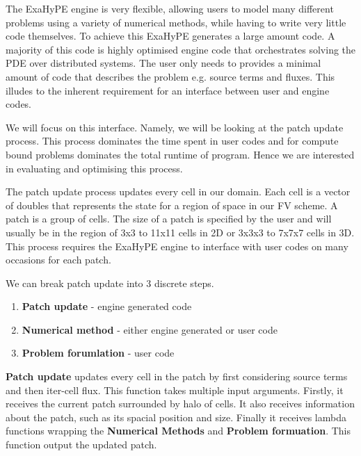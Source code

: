 


The ExaHyPE engine is very flexible, allowing users to model many different problems using a variety of numerical methods, while having to write very little code themselves.
To achieve this ExaHyPE generates a large amount code.
A majority of this code is highly optimised engine code that orchestrates solving the PDE over distributed systems.
The user only needs to provides a minimal amount of code that describes the problem e.g. source terms and fluxes.
This illudes to the inherent requirement for an interface between user and engine codes.

We will focus on this interface.
Namely, we will be looking at the patch update process.
This process dominates the time spent in user codes and for compute bound problems dominates the total runtime of program.
Hence we are interested in evaluating and optimising this process.

The patch update process updates every cell in our domain.
Each cell is a vector of doubles that represents the state for a region of space in our FV scheme. 
A patch is a group of cells.
The size of a patch is specified by the user and will usually be in the region of 3x3 to 11x11 cells in 2D or 3x3x3 to 7x7x7 cells in 3D. %
This process requires the ExaHyPE engine to interface with user codes on many occasions for each patch.
 
\newcommand{\func}[1]{\textbf{#1}}
\newcommand{\var}[1]{\textbf{#1}}

We can break patch update into 3 discrete steps.
\begin{enumerate}
    \item \func{Patch update} - engine generated code
    \item  \func{Numerical method} - either engine generated or user code
    \item \func{Problem forumlation} - user code
\end{enumerate}

\func{Patch update} updates every cell in the patch by first considering source terms and then iter-cell flux.
This function takes multiple input arguments.
Firstly, it receives the current patch surrounded by halo of cells.
It also receives information about the patch, such as its spacial position and size.
Finally it receives lambda functions wrapping the \func{Numerical Methods} and \func{Problem formuation}. 
This function output the updated patch.  

